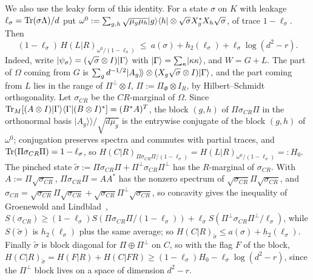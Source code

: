 We also use the leaky form of this identity. For a state $\sigma$ on $K$ with leakage $\ell_\sigma=\operatorname{Tr}(\sigma\Lambda)/d$ put
$\omega^0:=\sum_{g,h}\sqrt{\mu_g\mu_h}\lvert g\rangle\langle h\rvert\otimes\sqrt\sigma X_g^*X_h\sqrt\sigma$, of trace $1-\ell_\sigma$. Then
\begin{equation}\label{eq:leaky-conditional}
(1-\ell_\sigma)\,H(L|R)_{\omega^0/(1-\ell_\sigma)}\ \le\ a(\sigma)+h_2(\ell_\sigma)+\ell_\sigma\log(d^2-r).
\end{equation}
Indeed, write $\lvert \psi_\sigma\rangle=(\sqrt\sigma\otimes I)\lvert \Gamma\rangle$ with $\lvert \Gamma\rangle=\sum_\kappa\lvert \kappa\kappa\rangle$, and $W=G+L$. The part of $\Omega$ coming from $G$ is
$\sum_gd^{-1/2}\vert A_g\rangle\!\rangle\otimes(X_g\sqrt\sigma\otimes I)\lvert \Gamma\rangle$, and the part coming from $L$ lies in the range of $\Pi^\perp\otimes I$, $\Pi:=\Pi_\Phi\otimes I_R$, by
Hilbert--Schmidt orthogonality. Let $\sigma_{CR}$ be the $CR$-marginal of $\Omega$. Since $\operatorname{Tr}_M[(A\otimes I)\lvert \Gamma\rangle\langle \Gamma\rvert(B\otimes I)^*]=(B^*A)^T$, the block $(g,h)$ of
$\Pi\sigma_{CR}\Pi$ in the orthonormal basis $\vert A_g\rangle\!\rangle/\sqrt{d\mu_g}$ is the entrywise conjugate of the block $(g,h)$ of $\omega^0$; conjugation preserves spectra and
commutes with partial traces, and $\operatorname{Tr}(\Pi\sigma_{CR}\Pi)=1-\ell_\sigma$, so $H(C|R)_{\Pi\sigma_{CR}\Pi/(1-\ell_\sigma)}=H(L|R)_{\omega^0/(1-\ell_\sigma)}=:H_0$. The pinched state
$\tilde\sigma:=\Pi\sigma_{CR}\Pi+\Pi^\perp\sigma_{CR}\Pi^\perp$ has the $R$-marginal of $\sigma_{CR}$. With $A:=\Pi\sqrt{\sigma_{CR}}$, $\Pi\sigma_{CR}\Pi=AA^*$ has the nonzero spectrum of
$\sqrt{\sigma_{CR}}\Pi\sqrt{\sigma_{CR}}$, and $\sigma_{CR}=\sqrt{\sigma_{CR}}\Pi\sqrt{\sigma_{CR}}+\sqrt{\sigma_{CR}}\Pi^\perp\sqrt{\sigma_{CR}}$, so concavity gives the inequality of Groenewold
and Lindblad~\cite{Lindblad1972}, $S(\sigma_{CR})\ge(1-\ell_\sigma)S(\Pi\sigma_{CR}\Pi/(1-\ell_\sigma))+\ell_\sigma S(\Pi^\perp\sigma_{CR}\Pi^\perp/\ell_\sigma)$, while $S(\tilde\sigma)$ is $h_2(\ell_\sigma)$
plus the same average; so $H(C|R)_{\tilde\sigma}\le a(\sigma)+h_2(\ell_\sigma)$. Finally $\tilde\sigma$ is block diagonal for $\Pi\oplus\Pi^\perp$ on $C$, so with the flag $F$ of the
block, $H(C|R)_{\tilde\sigma}=H(F|R)+H(C|FR)\ge(1-\ell_\sigma)H_0-\ell_\sigma\log(d^2-r)$, since the $\Pi^\perp$ block lives on a space of dimension $d^2-r$.

